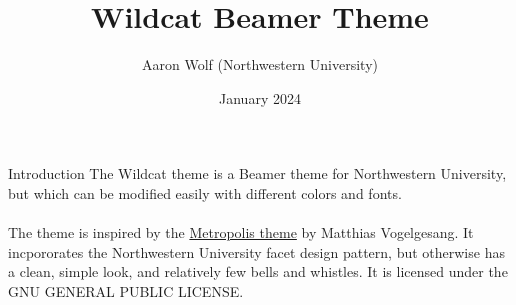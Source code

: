 \documentclass[aspectratio=1610]{beamer}
\title{Wildcat Beamer Theme}
\date{January 2024}
\author{Aaron Wolf (Northwestern University)}
\begin{document}
\begin{frame}
\titlepage
\end{frame}


\begin{frame}{Introduction}
    The Wildcat theme is a Beamer theme for Northwestern University, but which can be modified easily with different colors and fonts. 
    \\ ~ \\
    The theme is inspired by the \href{https://github.com/matze/mtheme}{Metropolis theme} by Matthias Vogelgesang. It incpororates the Northwestern University facet design pattern, but otherwise has a clean, simple look, and relatively few bells and whistles. It is licensed under the GNU GENERAL PUBLIC LICENSE.
\end{frame}
\end{document}
